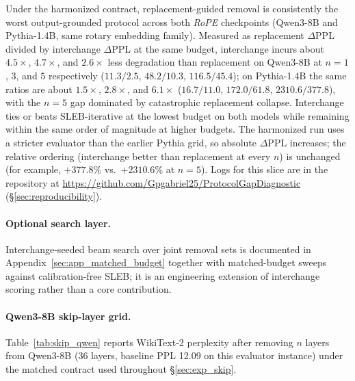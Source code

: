 \documentclass{article}
\begin{document}
Under the harmonized contract, replacement-guided removal is consistently the worst output-grounded protocol across both \emph{RoPE} checkpoints (Qwen3-8B and Pythia-1.4B, same rotary embedding family). Measured as replacement $\Delta$PPL divided by interchange $\Delta$PPL at the same budget, interchange incurs about $4.5\times$, $4.7\times$, and $2.6\times$ less degradation than replacement on Qwen3-8B at $n{=}1$, $3$, and $5$ respectively ($11.3/2.5$, $48.2/10.3$, $116.5/45.4$); on Pythia-1.4B the same ratios are about $1.5\times$, $2.8\times$, and $6.1\times$ ($16.7/11.0$, $172.0/61.8$, $2310.6/377.8$), with the $n{=}5$ gap dominated by catastrophic replacement collapse. Interchange ties or beats SLEB-iterative at the lowest budget on both models while remaining within the same order of magnitude at higher budgets. The harmonized run uses a stricter evaluator than the earlier Pythia grid, so absolute $\Delta$PPL increases; the relative ordering (interchange better than replacement at every $n$) is unchanged (for example, $+377.8\%$ vs.\ $+2310.6\%$ at $n{=}5$). Logs for this slice are in the repository at \url{https://github.com/Gpgabriel25/ProtocolGapDiagnostic} (\S\ref{sec:reproducibility}).

\paragraph{Optional search layer.}
Interchange-seeded beam search over joint removal sets is documented in Appendix~\ref{sec:app_matched_budget} together with matched-budget sweeps against calibration-free SLEB; it is an engineering extension of interchange scoring rather than a core contribution.

\paragraph{Qwen3-8B skip-layer grid.}
Table~\ref{tab:skip_qwen} reports WikiText-2 perplexity after removing $n$ layers from Qwen3-8B (36 layers, baseline PPL 12.09 on this evaluator instance) under the matched contract used throughout \S\ref{sec:exp_skip}.
\end{document}
